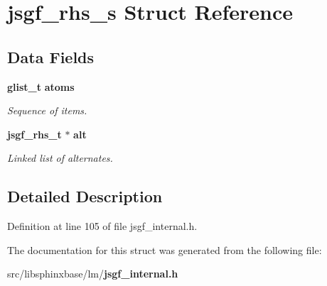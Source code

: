 \section{jsgf\+\_\+rhs\+\_\+s Struct Reference}
\label{structjsgf__rhs__s}
\subsection*{Data Fields}
\begin{DoxyCompactItemize}
\item 
{\bf glist\+\_\+t} {\bf atoms}\label{structjsgf__rhs__s_a53c517a31c83eb357764fb891bba7008}

\begin{DoxyCompactList}\small\item\em Sequence of items. \end{DoxyCompactList}\item 
{\bf jsgf\+\_\+rhs\+\_\+t} $\ast$ {\bf alt}\label{structjsgf__rhs__s_ad07cf44d48798d86633b37e9e6e67ff5}

\begin{DoxyCompactList}\small\item\em Linked list of alternates. \end{DoxyCompactList}\end{DoxyCompactItemize}


\subsection{Detailed Description}


Definition at line 105 of file jsgf\+\_\+internal.\+h.



The documentation for this struct was generated from the following file\+:\begin{DoxyCompactItemize}
\item 
src/libsphinxbase/lm/{\bf jsgf\+\_\+internal.\+h}\end{DoxyCompactItemize}
